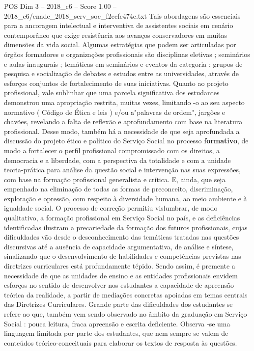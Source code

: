 \begin{textsample}{POS Dim 3 – 2018\_c6 – Score 1.00 – 2018\_c6/enade\_2018\_serv\_soc\_f2ecfc474e.txt}
Tais abordagens são essenciais para a ancoragem intelectual e interventiva de assistentes sociais em cenário contemporâneo que exige resistência aos avanços conservadores em muitas dimensões da vida social.
Algumas estratégias que podem ser articuladas por órgãos formadores e organizações profissionais são disciplinas eletivas ; seminários e aulas inaugurais ; temáticas em seminários e eventos da categoria ; grupos de pesquisa e socialização de debates e estudos entre as universidades, através de esforços conjuntos de fortalecimento de suas iniciativas.
Quanto ao projeto profissional, vale sublinhar que uma parcela significativa dos estudantes demonstrou uma apropriação restrita, muitas vezes, limitando -o ao seu aspecto normativo ( Código de Ética e leis ) e/ou a"palavras de ordem", jargões e chavões, revelando a falta de reflexão e aprofundamento com base na literatura profissional.
Desse modo, também há a necessidade de que seja aprofundada a discussão do projeto ético e político do Serviço Social no processo \textbf{formativo}, de modo a fortalecer o perfil profissional compromissado com os direitos, a democracia e a liberdade, com a perspectiva da totalidade e com a unidade teoria-prática para análise da questão social e intervenção nas suas expressões, com base na formação profissional generalista e crítica.
E, ainda, que seja empenhado na eliminação de todas as formas de preconceito, discriminação, exploração e opressão, com respeito à diversidade humana, ao meio ambiente e à igualdade social.
O processo de correção permitiu vislumbrar, de modo qualitativo, a formação profissional em Serviço Social no país, e as deficiências identificadas ilustram a precariedade da formação dos futuros profissionais, cujas dificuldades vão desde o desconhecimento das temáticas tratadas nas questões discursivas até a ausência de capacidade argumentativa, de análise e síntese, sinalizando que o desenvolvimento de habilidades e competências previstas nas diretrizes curriculares está profundamente tépido.
Sendo assim, é premente a necessidade de que as unidades de ensino e as entidades profissionais envidem esforços no sentido de desenvolver nos estudantes a capacidade de apreensão teórica da realidade, a partir de mediações concretas apoiadas em temas centrais das Diretrizes Curriculares.
Grande parte das dificuldades dos estudantes se refere ao que, também vem sendo observado no âmbito da graduação em Serviço Social : pouca leitura, fraca apreensão e escrita deficiente.
Observa -se uma linguagem limitada por parte dos estudantes, que nem sempre se valem de conteúdos teórico-conceituais para elaborar os textos de resposta às questões.

\end{textsample}

